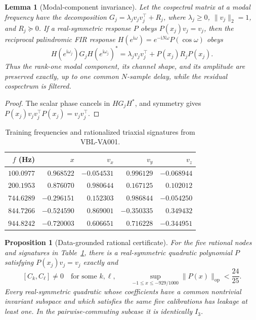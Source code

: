 \documentclass[11pt]{article}
\newtheorem{proposition}[theorem]{Proposition}
\newtheorem{lemma}[theorem]{Lemma}
\theoremstyle{remark}
\newcommand{\op}{\mathrm{op}}
\begin{document}
\begin{lemma}[Modal-component invariance]\label{lem:fddinvariance}
Let the cospectral matrix at a modal frequency have the decomposition
$G_j=\lambda_jv_jv_j^\top+R_j$, where $\lambda_j\ge0$, $\|v_j\|_2=1$, and
$R_j\succeq0$.  If a real-symmetric response $P$ obeys
$P(x_j)v_j=v_j$, then the reciprocal palindromic FIR response
$H(e^{\mathrm{i}\omega})=e^{-\mathrm{i}N\omega}P(\cos\omega)$ obeys
\[
 H(e^{\mathrm{i}\omega_j})G_jH(e^{\mathrm{i}\omega_j})^*
 =\lambda_jv_jv_j^\top+P(x_j)R_jP(x_j).
\]
Thus the rank-one modal component, its channel shape, and its amplitude are
preserved exactly, up to one common $N$-sample delay, while the residual
cospectrum is filtered.
\end{lemma}

\begin{proof}
The scalar phase cancels in $H G_j H^*$, and symmetry gives
$P(x_j)v_jv_j^\top P(x_j)=v_jv_j^\top$.
\end{proof}

\begin{table}[H]
\centering
\small
\begin{tabular}{@{}rrrrr@{}}
\toprule
$f$ (Hz) & $x$ & $v_x$ & $v_y$ & $v_z$\\
\midrule
$100.0977$ & $ 0.968522$ & $-0.054531$ & $ 0.996129$ & $-0.068944$\\
$200.1953$ & $ 0.876070$ & $ 0.980644$ & $ 0.167125$ & $ 0.102012$\\
$744.6289$ & $-0.296151$ & $ 0.152303$ & $ 0.986844$ & $-0.054250$\\
$844.7266$ & $-0.524590$ & $ 0.869001$ & $-0.350335$ & $ 0.349432$\\
$944.8242$ & $-0.720003$ & $ 0.606651$ & $ 0.716228$ & $-0.344951$\\
\bottomrule
\end{tabular}
\caption{Training frequencies and rationalized triaxial signatures from
VBL-VA001.}
\label{tab:vblcalibration}
\end{table}

\begin{proposition}[Data-grounded rational certificate]
\label{prop:vblcertificate}
For the five rational nodes and signatures in
Table~\ref{tab:vblcalibration}, there is a real-symmetric quadratic polynomial
$P$ satisfying $P(x_j)v_j=v_j$ exactly and
\[
 [C_k,C_\ell]\ne0\quad\text{for some }k,\ell,
 \qquad
 \sup_{-1\le x\le-929/1000}\|P(x)\|_{\op}<\frac{24}{25}.
\]
Every real-symmetric quadratic whose coefficients have a common nontrivial
invariant subspace and which satisfies the same five calibrations has leakage
at least one.  In the pairwise-commuting subcase it is identically $I_3$.
\end{proposition}
\end{document}
